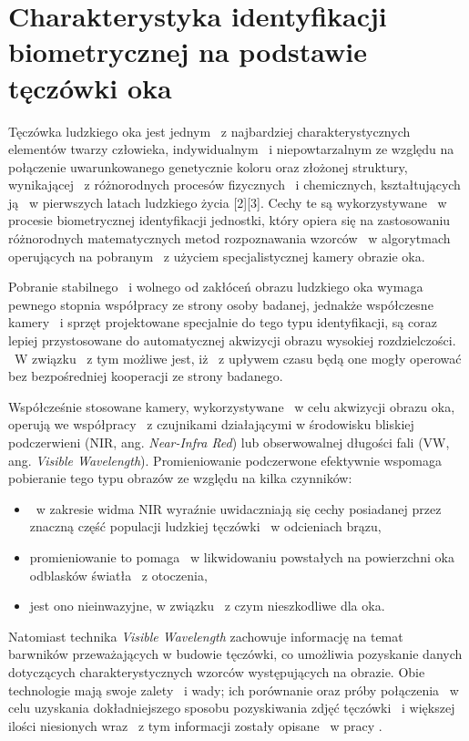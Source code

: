 
\section{Charakterystyka identyfikacji biometrycznej na podstawie tęczówki oka}
\label{sec:zawartoscPracy}


Tęczówka ludzkiego oka jest jednym ~z najbardziej charakterystycznych elementów twarzy człowieka, indywidualnym ~i niepowtarzalnym ze względu na połączenie uwarunkowanego genetycznie koloru oraz złożonej struktury, wynikającej ~z różnorodnych procesów fizycznych ~i chemicznych, kształtujących ją ~w pierwszych latach ludzkiego życia [2][3]. Cechy te są wykorzystywane ~w procesie biometrycznej identyfikacji jednostki, który opiera się na zastosowaniu różnorodnych matematycznych metod rozpoznawania wzorców ~w algorytmach operujących na pobranym ~z użyciem specjalistycznej kamery obrazie oka.

Pobranie stabilnego ~i wolnego od zakłóceń obrazu ludzkiego oka wymaga pewnego stopnia współpracy ze strony osoby badanej, jednakże współczesne kamery ~i sprzęt projektowane specjalnie do tego typu identyfikacji, są  coraz lepiej przystosowane do automatycznej akwizycji obrazu wysokiej rozdzielczości. ~W związku ~z tym możliwe jest, iż ~z upływem czasu będą one mogły operować bez bezpośredniej kooperacji ze strony badanego.

Współcześnie stosowane kamery, wykorzystywane ~w celu akwizycji obrazu oka, operują we współpracy ~z czujnikami działającymi w środowisku bliskiej podczerwieni (NIR, ang. \emph{Near-Infra Red}) lub obserwowalnej długości fali (VW, ang. \emph{Visible Wavelength}). Promieniowanie podczerwone efektywnie wspomaga pobieranie tego typu obrazów ze względu na kilka czynników:
\begin{itemize} 
\item ~w zakresie widma NIR wyraźnie uwidaczniają się cechy posiadanej przez znaczną część populacji ludzkiej tęczówki ~w  odcieniach brązu,
\item promieniowanie to pomaga ~w likwidowaniu powstałych na powierzchni oka odblasków światła ~z otoczenia,
\item jest ono nieinwazyjne, w związku ~z czym nieszkodliwe dla oka.
\end{itemize}
Natomiast technika \emph{Visible Wavelength} zachowuje informację na temat barwników przeważających w budowie tęczówki, co umożliwia pozyskanie danych dotyczących charakterystycznych wzorców występujących na obrazie. Obie technologie mają swoje zalety ~i wady; ich porównanie oraz próby połączenia ~w celu uzyskania dokładniejszego sposobu pozyskiwania zdjęć tęczówki ~i większej ilości niesionych wraz ~z tym informacji zostały opisane ~w pracy \cite{Hos10}. 

